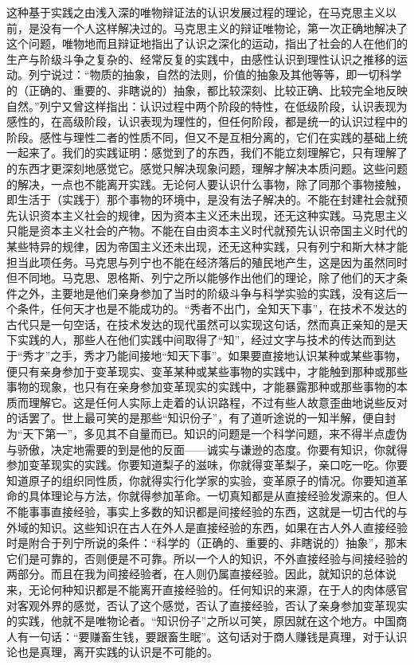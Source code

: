 这种基于实践之由浅入深的唯物辩证法的认识发展过程的理论，在马克思主义以前，是没有一个人这样解决过的。马克思主义的辩证唯物论，第一次正确地解决了这个问题，唯物地而且辩证地指出了认识之深化的运动，指出了社会的人在他们的生产与阶级斗争之复杂的、经常反复的实践中，由感性认识到理性认识之推移的运动。列宁说过：“物质的抽象，自然的法则，价值的抽象及其他等等，即一切科学的（正确的、重要的、非瞎说的）抽象，都比较深刻、比较正确、比较完全地反映自然。”列宁又曾这样指出：认识过程中两个阶段的特性，在低级阶段，认识表现为感性的，在高级阶段，认识表现为理性的，但任何阶段，都是统一的认识过程中的阶段。感性与理性二者的性质不同，但又不是互相分离的，它们在实践的基础上统一起来了。我们的实践证明：感觉到了的东西，我们不能立刻理解它，只有理解了的东西才更深刻地感觉它。感觉只解决现象问题，理解才解决本质问题。这些问题的解决，一点也不能离开实践。无论何人要认识什么事物，除了同那个事物接触，即生活于（实践于）那个事物的环境中，是没有法子解决的。不能在封建社会就预先认识资本主义社会的规律，因为资本主义还未出现，还无这种实践。马克思主义只能是资本主义社会的产物。不能在自由资本主义时代就预先认识帝国主义时代的某些特异的规律，因为帝国主义还未出现，还无这种实践，只有列宁和斯大林才能担当此项任务。马克思与列宁也不能在经济落后的殖民地产生，这是因为虽然同时但不同地。马克思、恩格斯、列宁之所以能够作出他们的理论，除了他们的天才条件之外，主要地是他们亲身参加了当时的阶级斗争与科学实验的实践，没有这后一个条件，任何天才也是不能成功的。“秀者不出门，全知天下事”，在技术不发达的古代只是一句空话，在技术发达的现代虽然可以实现这句话，然而真正亲知的是天下实践的人，那些人在他们实践中间取得了“知”，经过文字与技术的传达而到达于“秀才”之手，秀才乃能间接地“知天下事”。如果要直接地认识某种或某些事物，便只有亲身参加于变革现实、变革某种或某些事物的实践中，才能触到那种或那些事物的现象，也只有在亲身参加变革现实的实践中，才能暴露那种或那些事物的本质而理解它。这是任何人实际上走着的认识路程，不过有些人故意歪曲地说些反对的话罢了。世上最可笑的是那些“知识份子”，有了道听途说的一知半解，便自封为“天下第一”，多见其不自量而已。知识的问题是一个科学问题，来不得半点虚伪与骄傲，决定地需要的到是他的反面——诚实与谦逊的态度。你要有知识，你就得参加变革现实的实践。你要知道梨子的滋味，你就得变革梨子，亲口吃一吃。你要知道原子的组织同性质，你就得实行化学家的实验，变革原子的情况。你要知道革命的具体理论与方法，你就得参加革命。一切真知都是从直接经验发源来的。但人不能事事直接经验，事实上多数的知识都是间接经验的东西，这就是一切古代的与外域的知识。这些知识在古人在外人是直接经验的东西，如果在古人外人直接经验时是附合于列宁所说的条件：“科学的（正确的、重要的、非瞎说的）抽象”，那末它们是可靠的，否则便是不可靠。所以一个人的知识，不外直接经验与间接经验的两部分。而且在我为间接经验者，在人则仍属直接经验。因此，就知识的总体说来，无论何种知识都是不能离开直接经验的。任何知识的来源，在于人的肉体感官对客观外界的感觉，否认了这个感觉，否认了直接经验，否认了亲身参加变革现实的实践，他就不是唯物论者。“知识份子”之所以可笑，原因就在这个地方。中国商人有一句话：“要赚畜生钱，要跟畜生眠”。这句话对于商人赚钱是真理，对于认识论也是真理，离开实践的认识是不可能的。

